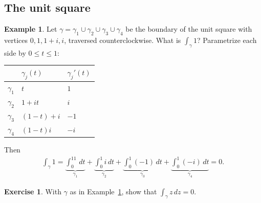 \documentclass[11pt]{article}
\theoremstyle{plain}
\theoremstyle{definition}
\newtheorem{example}[theorem]{Example}
\newtheorem{exercise}[theorem]{Exercise}
\theoremstyle{remark}
\numberwithin{equation}{section}
\newcommand{\be}{\begin{eqnarray}}
\newcommand{\ee}{\end{eqnarray}}
\begin{document}
\subsection*{The unit square}
\begin{example}
\label{ex:unit-square}
Let $\gamma=\gamma_1\cup\gamma_2\cup\gamma_3\cup\gamma_4$ be the boundary of
the unit square with vertices $0,1,1+i,i$, traversed counterclockwise. What
is $\int_\gamma1$? Parametrize each side by $0\leq t\leq1$:

\noindent
\begin{minipage}[c]{0.36\textwidth}
\centering
{}
\end{minipage}\hfill
\begin{minipage}[c]{0.6\textwidth}
\begin{center}
\renewcommand{\arraystretch}{1.25}
\begin{tabular}{lll}
 & $\gamma_j(t)$ & $\gamma_j'(t)$\\\hline
 $\gamma_1$ & $t$ & $1$\\
 $\gamma_2$ & $1+it$ & $i$\\
 $\gamma_3$ & $(1-t)+i$ & $-1$\\
 $\gamma_4$ & $(1-t)i$ & $-i$
\end{tabular}
\end{center}
\end{minipage}

Then
\be
 \int_\gamma1=\underbrace{\int_0^11\,dt}_{\gamma_1}+\underbrace{\int_0^1i\,dt}_{\gamma_2}
 +\underbrace{\int_0^1(-1)\,dt}_{\gamma_3}+\underbrace{\int_0^1(-i)\,dt}_{\gamma_4}=0.
\ee
\end{example}

\begin{exercise}
With $\gamma$ as in Example~\ref{ex:unit-square}, show that
$\int_\gamma z\,dz=0$.
\end{exercise}
\end{document}
